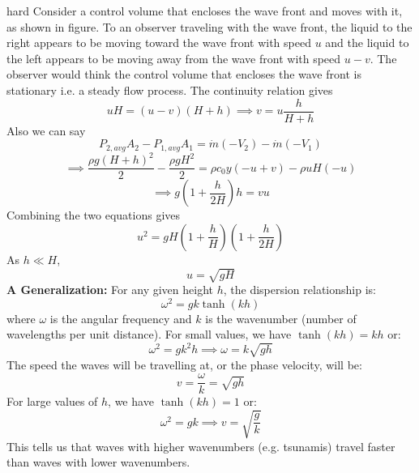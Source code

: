 \begin{solution}{hard}
Consider a control volume that encloses the wave front and moves with it, as shown in figure. To an observer traveling with the wave front, the liquid to the right appears to be moving toward the wave front with speed $u$ and the liquid to the left appears to be moving away from the wave front with speed $u-v$. The observer would think the control volume that encloses the wave front is stationary i.e. a steady flow process.
The continuity relation gives$$uH = (u-v)(H+h)\implies v = u \frac{h}{H+h}$$Also we can say$$ P_{2,avg}A_2-P_{1,avg}A_1 = \dot{m}(-V_2)-\dot{m}(-V_1)$$$$\implies \frac{\rho g(H+h)^2}{2} - \frac{\rho g H^2 }{2} = \rho c_0y(-u + v) - \rho u H(-u)$$$$\implies g \left(1+\frac{h}{2H}\right) h = vu$$Combining the two equations gives
$$u^2 = gH\left(1+\frac{h}{H}\right) \left(1+\frac{h}{2H}\right)$$As $h \ll H$,
$$u= \boxed{\sqrt{gH}}$$
\tcbline
\textbf{A Generalization:} For any given height $h$, the dispersion relationship is:
$$\omega^2 = gk \tanh(kh)$$where $\omega$ is the angular frequency and $k$ is the wavenumber (number of wavelengths per unit distance). For small values, we have $\tanh(kh)=kh$ or:
$$\omega^2 = gk^2h \implies \omega=k\sqrt{gh}$$The speed the waves will be travelling at, or the phase velocity, will be:
$$\boxed{v=\frac{\omega}{k}=\sqrt{gh}}$$For large values of $h$, we have $\tanh(kh)=1$ or:
$$\omega^2=gk \implies v = \sqrt{\frac{g}{k}}$$This tells us that waves with higher wavenumbers (e.g. tsunamis) travel faster than waves with lower wavenumbers.
\end{solution}
